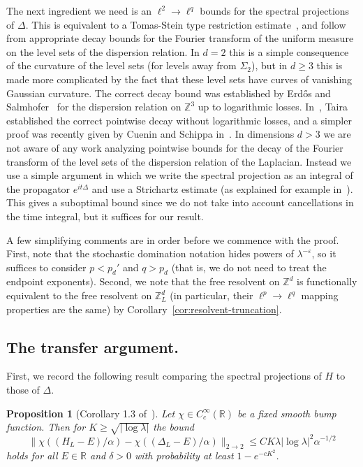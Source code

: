 \documentclass[11pt]{amsart}
\def\R{{\mathbb{R}}}
\def\bbZ{{\mathbb Z}}
\def\eps{{\varepsilon}}
\numberwithin{equation}{section}
\numberwithin{theorem}{section}
\newtheorem{proposition}[theorem]{Proposition}
\begin{document}
The next ingredient we need is an $\ell^2\to\ell^q$ bounds for the spectral projections of $\Delta$.  This is equivalent to a Tomas-Stein type restriction estimate~\cite{tomas1975restriction}, and follow from appropriate decay bounds for the Fourier transform of the uniform measure on the level sets of the dispersion relation.  In $d=2$ this is a simple consequence of the curvature of the level sets (for levels away from $\Sigma_2$), but in $d\geq 3$ this is made more complicated by the fact that these level sets have curves of vanishing Gaussian curvature.
The correct decay bound was established by Erd{\H o}s and Salmhofer~\cite{ErdosSalmhofer} for the
dispersion relation on $\bbZ^3$ up to logarithmic losses. In~\cite{Taira}, Taira established the correct pointwise decay without logarithmic losses, and a simpler proof was recently given by Cuenin and Schippa in~\cite{CueninSchippa}.  In dimensions $d>3$ we
are not aware of any work analyzing pointwise bounds for the decay of the Fourier transform of the level sets of the dispersion relation of the Laplacian.  Instead we use a simple argument in which we write the spectral projection as an integral
of the propagator $e^{it\Delta}$ and use a Strichartz estimate (as explained for example in~\cite[Section 5.4]{germain}).  This gives a suboptimal bound since we do not take into account cancellations in the time integral, but it suffices for our result.

A few simplifying comments are in order before we commence with the proof.  First, note that the stochastic
domination notation hides powers of $\lambda^{-\eps}$, so it suffices to consider $p<p_d'$ and $q>p_d$ (that is, we do not need to treat the endpoint exponents).  Second, we note that the free resolvent on $\bbZ^d$ is functionally equivalent to the free resolvent on $\bbZ^d_L$ (in
particular, their $\ell^p\to\ell^q$ mapping properties are the same)
by Corollary~\ref{cor:resolvent-truncation}.

\subsection{The transfer argument.}
\label{sec:transfer}

First, we record the following result comparing the spectral projections of $H$ to those of $\Delta$.
\begin{proposition}[Corollary 1.3 of~\cite{BDH}]
\label{prp:zero-bd}
Let $\chi \in C_c^\infty(\R)$ be a fixed smooth bump function.  Then for
$K\geq \sqrt{|\log \lambda|}$ the bound
\[
\|\chi( (H_L-E) / \alpha) - \chi( (\Delta_L-E)/\alpha) \|_{2\to 2}
\leq C K \lambda |\log \lambda|^2 \alpha^{-1/2}
\]
holds for all $E\in \R$ and $\delta>0$ with probability at least $1-e^{-cK^2}$.
\end{proposition}
\end{document}

